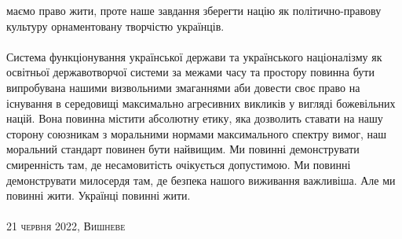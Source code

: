 маємо право жити, проте наше завдання зберегти націю як політично-правову
культуру орнаментовану творчістю українців.
\\
\\
Система функціонування української держави та українського націоналізму
як освітньої державотворчої системи за межами часу та простору повинна
бути випробувана нашими визвольними змаганнями аби довести своє право
на існування в середовищі максимально агресивних викликів у вигляді
божевільних націй. Вона повинна містити абсолютну етику, яка дозволить
ставати на нашу сторону союзникам з моральними нормами максимального
спектру вимог, наш моральний стандарт повинен бути найвищим. Ми повинні
демонструвати смиренність там, де несамовитість очікується допустимою.
Ми повинні демонструвати милосердя там, де безпека нашого виживання важливіша.
Але ми повинні жити. Українці повинні жити.
\\
\\
\textsc{\footnotesize 21 червня 2022, Вишневе}

\normalsize
